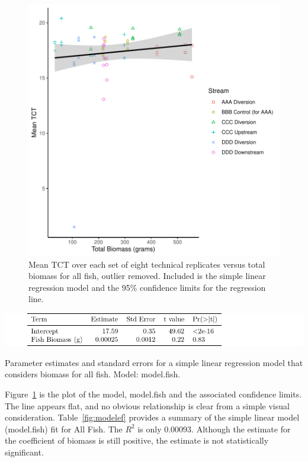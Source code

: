 \begin{figure}[H]
\includegraphics{Chapter5Images/gg_ef.pdf}
\caption{ \hspace{1mm} Mean TCT over each set of eight technical replicates versus total biomass for all fish, outlier removed. Included is the simple linear regression model and the 95\% confidence limits for the regression line.}
\label{fig:efanalysis}
\end{figure}


\begin{table}[H]
\includegraphics{Chapter5Images/eflinearfield.pdf}
\caption{Parameter estimates and standard errors for a simple linear regression model that considers biomass for all fish. Model: model.fish.}
\label{fig:modelef}
\end{table}


 Figure~\ref{fig:efanalysis} is the plot of the model, model.fish and the associated confidence limits. The line appears flat, and no obvious relationship is clear from a simple visual consideration. Table~\ref{fig:modelef} provides a summary of the simple linear model (model.fish) fit for All Fish. The $R^{2}$ is only 0.00093. Although the estimate for the coefficient of biomass is still positive, the estimate is not statistically significant. 


